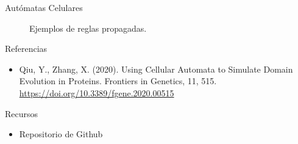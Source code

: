 \documentclass{beamer}
\begin{document}
\begin{frame}{Autómatas Celulares}
\begin{figure}[ht]
\centering

\caption{Ejemplos de reglas propagadas.}
\label{fig:direct_svg}
\end{figure}
\end{frame}


\begin{frame}{Referencias}
\begin{itemize}
\item Qiu, Y., Zhang, X. (2020). Using Cellular Automata to Simulate Domain Evolution in Proteins. Frontiers in Genetics, 11, 515. \url{https://doi.org/10.3389/fgene.2020.00515}
\end{itemize}
\end{frame}

\begin{frame}{Recursos}
\begin{itemize}
\item Repositorio de Github \url{}
\end{itemize}
\end{frame}
\end{document}

